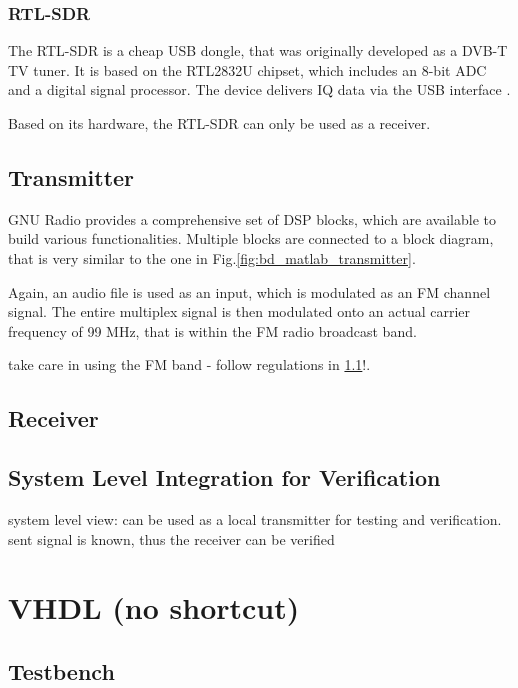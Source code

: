 \subsubsection{RTL-SDR}

The RTL-SDR is a cheap USB dongle, that was originally developed as a DVB-T TV tuner.
It is based on the RTL2832U chipset, which includes an 8-bit ADC and a digital signal processor.
The device delivers IQ data via the USB interface \cite{RTLSDR}.

Based on its hardware, the RTL-SDR can only be used as a receiver.

\subsection{Transmitter}

GNU Radio provides a comprehensive set of DSP blocks, which are available to build various functionalities.
Multiple blocks are connected to a block diagram, that is very similar to the one in Fig.\ref{fig:bd_matlab_transmitter}.

Again, an audio file is used as an input, which is modulated as an FM channel signal.
The entire multiplex signal is then modulated onto an actual carrier frequency of 99 MHz, that is within the FM radio broadcast band.

take care in using the FM band - follow regulations in \ref{}!.

\subsection{Receiver}

\subsection{System Level Integration for Verification}

system level view: can be used as a local transmitter for testing and verification.
sent signal is known, thus the receiver can be verified

\section{VHDL (no shortcut)}
  \subsection{Testbench}
